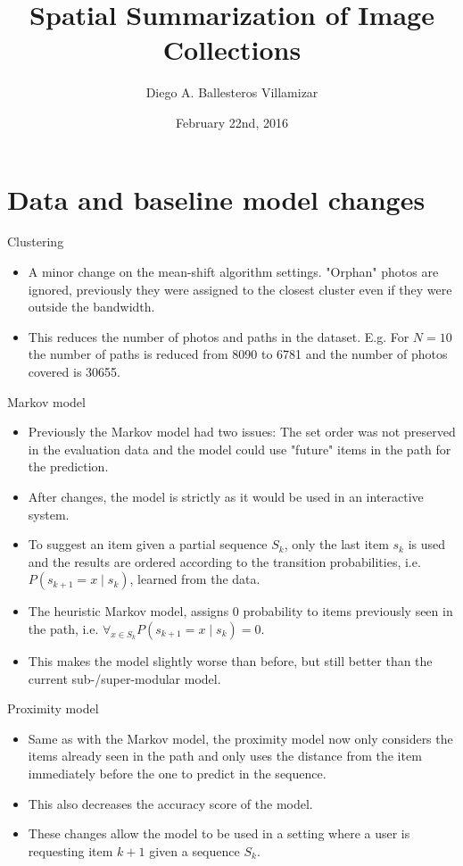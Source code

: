 \documentclass{beamer}
\title[M.Sc. Thesis 2015]{Spatial Summarization of Image Collections}
\author{Diego A. Ballesteros Villamizar}
\institute[ETHZ]{ETH Zürich}
\date{February 22nd, 2016}
\begin{document}
\begin{frame}
  \titlepage
\end{frame}

\section{Data and baseline model changes}

\begin{frame}{Clustering}
  \begin{itemize}
    \item A minor change on the mean-shift algorithm settings. "Orphan" photos are ignored, previously they were assigned to the closest cluster even if they were outside the bandwidth.
    \item This reduces the number of photos and paths in the dataset. E.g. For $N=10$ the number of paths is reduced from 8090 to 6781 and the number of photos covered is 30655. 
  \end{itemize}
\end{frame}

\begin{frame}{Markov model}
  \begin{itemize}
    \item Previously the Markov model had two issues: The set order was not preserved in the evaluation data and the model could use "future" items in the path for the prediction.
    \item After changes, the model is strictly as it would be used in an interactive system.
    \item To suggest an item given a partial sequence $S_{k}$, only the last item $s_{k}$ is used and the results are ordered according to the transition probabilities, i.e. $P(s_{k+1} = x \mid s_{k})$, learned from the data.
    \item The heuristic Markov model, assigns 0 probability to items previously seen in the path, i.e. $\forall_{x \in S_{k}} P(s_{k+1} = x \mid s_{k}) = 0$.
    \item This makes the model slightly worse than before, but still better than the current sub-/super-modular model.
  \end{itemize}
\end{frame}

\begin{frame}{Proximity model}
  \begin{itemize}
    \item Same as with the Markov model, the proximity model now only considers the items already seen in the path and only uses the distance from the item immediately before the one to predict in the sequence.
    \item This also decreases the accuracy score of the model.
    \item These changes allow the model to be used in a setting where a user is requesting item $k+1$ given a sequence $S_{k}$.
  \end{itemize}
\end{frame}
\end{document}
